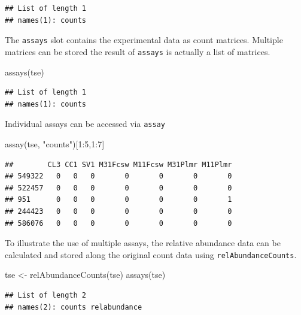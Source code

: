 \documentclass[
]{book}
\newenvironment{Shaded}{\begin{snugshade}}{\end{snugshade}}
\newcommand{\DecValTok}[1]{\textcolor[rgb]{0.00,0.00,0.81}{#1}}
\newcommand{\FunctionTok}[1]{\textcolor[rgb]{0.00,0.00,0.00}{#1}}
\newcommand{\NormalTok}[1]{#1}
\newcommand{\OtherTok}[1]{\textcolor[rgb]{0.56,0.35,0.01}{#1}}
\newcommand{\SpecialCharTok}[1]{\textcolor[rgb]{0.00,0.00,0.00}{#1}}
\newcommand{\StringTok}[1]{\textcolor[rgb]{0.31,0.60,0.02}{#1}}
\begin{document}
\begin{verbatim}
## List of length 1
## names(1): counts
\end{verbatim}

The \texttt{assays} slot contains the experimental data as count matrices. Multiple
matrices can be stored the result of \texttt{assays} is actually a list of matrices.

\begin{Shaded}
\begin{Highlighting}[]
\FunctionTok{assays}\NormalTok{(tse)}
\end{Highlighting}
\end{Shaded}

\begin{verbatim}
## List of length 1
## names(1): counts
\end{verbatim}

Individual assays can be accessed via \texttt{assay}

\begin{Shaded}
\begin{Highlighting}[]
\FunctionTok{assay}\NormalTok{(tse, }\StringTok{"counts"}\NormalTok{)[}\DecValTok{1}\SpecialCharTok{:}\DecValTok{5}\NormalTok{,}\DecValTok{1}\SpecialCharTok{:}\DecValTok{7}\NormalTok{]}
\end{Highlighting}
\end{Shaded}

\begin{verbatim}
##        CL3 CC1 SV1 M31Fcsw M11Fcsw M31Plmr M11Plmr
## 549322   0   0   0       0       0       0       0
## 522457   0   0   0       0       0       0       0
## 951      0   0   0       0       0       0       1
## 244423   0   0   0       0       0       0       0
## 586076   0   0   0       0       0       0       0
\end{verbatim}

To illustrate the use of multiple assays, the relative abundance data can be
calculated and stored along the original count data using \texttt{relAbundanceCounts}.

\begin{Shaded}
\begin{Highlighting}[]
\NormalTok{tse }\OtherTok{\textless{}{-}} \FunctionTok{relAbundanceCounts}\NormalTok{(tse)}
\FunctionTok{assays}\NormalTok{(tse)}
\end{Highlighting}
\end{Shaded}

\begin{verbatim}
## List of length 2
## names(2): counts relabundance
\end{verbatim}
\end{document}
